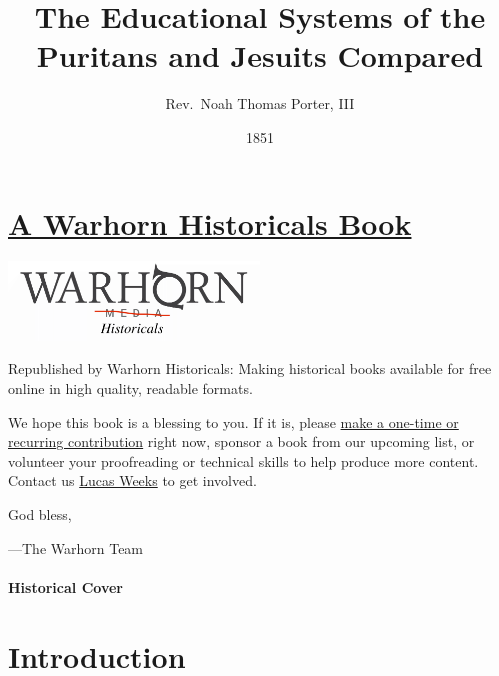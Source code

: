 \documentclass[]{book}
\title{The Educational Systems of the Puritans and Jesuits Compared}
\author{Rev.~Noah Thomas Porter, III}
\date{1851}
\begin{document}
\maketitle

{
\setcounter{tocdepth}{1}
\tableofcontents
}
\hypertarget{a-warhorn-historicals-book}{%
\chapter*{\texorpdfstring{\href{https://historicals.warhornmedia.com/}{A Warhorn Historicals Book}}{A Warhorn Historicals Book}}\label{a-warhorn-historicals-book}}

\includegraphics[width=0.5\textwidth,height=\textheight]{images/warhornlogo.png}

Republished by Warhorn Historicals:
Making historical books available for free online in high quality, readable formats.

We hope this book is a blessing to you. If it is, please \href{https://warhornmedia.com/give}{make a one-time or recurring contribution} right now, sponsor a book from our upcoming list, or volunteer your proofreading or technical skills to help produce more content. Contact us \href{mailto:lucas@beggarsborn.com}{Lucas Weeks} to get involved.

God bless,

---The Warhorn Team

\hypertarget{historical-cover}{%
\subsubsection*{Historical Cover}\label{historical-cover}}

\hypertarget{introduction}{%
\chapter*{Introduction}\label{introduction}}
\end{document}
